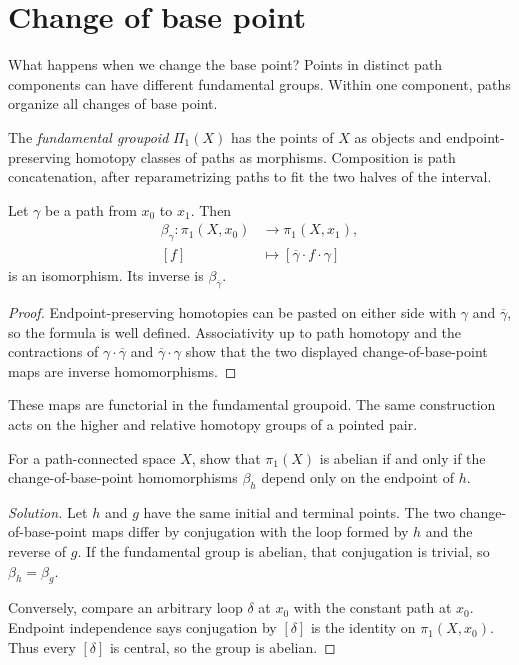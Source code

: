 \section{Change of base point}
\label{section-change-base-point}

What happens when we change the base point?
Points in distinct path components can have
different fundamental groups. Within one
component, paths organize all changes of
base point.

\begin{definition}
The \emph{fundamental groupoid} $\Pi_1(X)$
has the points of $X$ as objects and
endpoint-preserving homotopy classes of
paths as morphisms. Composition is path
concatenation, after reparametrizing paths
to fit the two halves of the interval.
\end{definition}

\begin{theorem}
\label{theorem-change-basepoint}
\label{teo:cambioptobase}
Let $\gamma$ be a path from $x_0$ to $x_1$.
Then
$$
\begin{aligned}
\beta_\gamma:
\pi_1(X,x_0)&\longrightarrow
\pi_1(X,x_1),\\
[f]&\longmapsto
[\overline\gamma\cdot f\cdot\gamma]
\end{aligned}
$$
is an isomorphism. Its inverse is
$\beta_{\overline\gamma}$.
\end{theorem}

\begin{proof}
Endpoint-preserving homotopies can be pasted
on either side with $\gamma$ and
$\overline\gamma$, so the formula is well
defined. Associativity up to path homotopy
and the contractions of
$\gamma\cdot\overline\gamma$ and
$\overline\gamma\cdot\gamma$ show that the
two displayed change-of-base-point maps are
inverse homomorphisms.
\end{proof}

These maps are functorial in the fundamental
groupoid. The same construction acts on the
higher and relative homotopy groups of a
pointed pair.

\begin{exercise}
For a path-connected space $X$, show that
$\pi_1(X)$ is
abelian if and only if the
change-of-base-point
homomorphisms $\beta_h$ depend only on the
endpoint of $h$.
\end{exercise}

\begin{proof}[Solution]
Let $h$ and $g$ have the same initial and
terminal points. The two change-of-base-point
maps differ by conjugation with the loop
formed
by $h$ and the reverse of $g$. If the
fundamental group is abelian, that
conjugation
is trivial, so $\beta_h=\beta_g$.

Conversely, compare an arbitrary loop
$\delta$
at $x_0$ with the constant path at $x_0$.
Endpoint independence says conjugation by
$[\delta]$ is the identity on
$\pi_1(X,x_0)$. Thus every $[\delta]$ is
central, so the group is abelian.
\end{proof}
